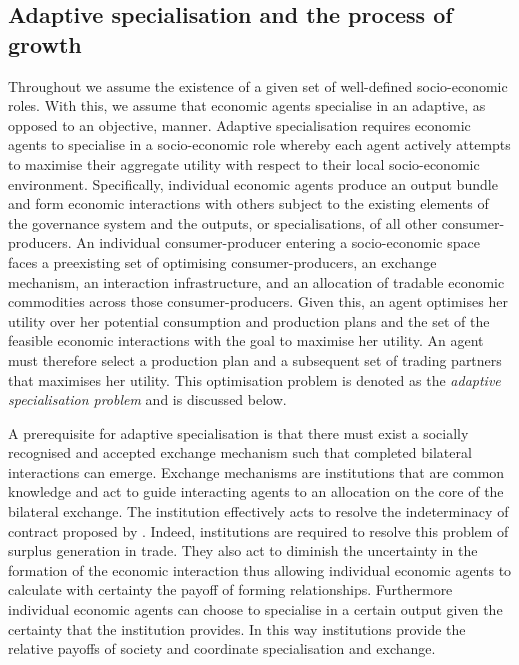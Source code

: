 \subsection{Adaptive specialisation and the process of growth}

Throughout we assume the existence of a given set of well-defined socio-economic roles. With this, we assume that economic agents specialise in an adaptive, as opposed to an objective, manner. Adaptive specialisation requires economic agents to specialise in a socio-economic role whereby each agent actively attempts to maximise their aggregate utility with respect to their local socio-economic environment. Specifically, individual economic agents produce an output bundle and form economic interactions with others subject to the existing elements of the governance system and the outputs, or specialisations, of all other consumer-producers. An individual consumer-producer entering a socio-economic space faces a preexisting set of optimising consumer-producers, an exchange mechanism, an interaction infrastructure, and an allocation of tradable economic commodities across those consumer-producers. Given this, an agent optimises her utility over her potential consumption and production plans and the set of the feasible economic interactions with the goal to maximise her utility. An agent must therefore select a production plan and a subsequent set of trading partners that maximises her utility. This optimisation problem is denoted as the \emph{adaptive specialisation problem} and is discussed below.

A prerequisite for adaptive specialisation is that there must exist a socially recognised and accepted exchange mechanism such that completed bilateral interactions can emerge. Exchange mechanisms are institutions that are common knowledge and act to guide interacting agents to an allocation on the core of the bilateral exchange. The institution effectively acts to resolve the indeterminacy of contract proposed by \citet{Edgeworth1881}. Indeed, institutions are required to resolve this problem of surplus generation in trade. They also act to diminish the uncertainty in the formation of the economic interaction thus allowing individual economic agents to calculate with certainty the payoff of forming relationships. Furthermore individual economic agents can choose to specialise in a certain output given the certainty that the institution provides. In this way institutions provide the relative payoffs of society and coordinate specialisation and exchange.

